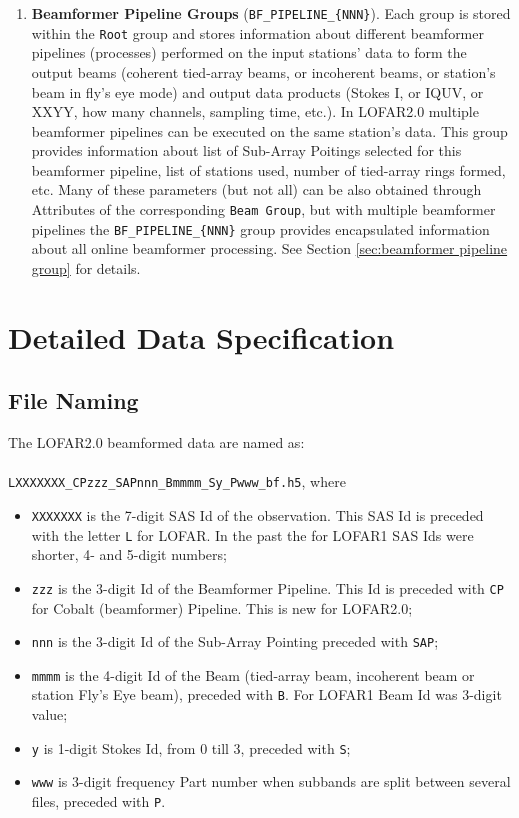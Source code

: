\documentclass[a4paper,10pt,bibtotoc]{scrartcl}
\begin{document}
\begin{enumerate}
\item \textbf{Beamformer Pipeline Groups} (\verb|BF_PIPELINE_{NNN}|). Each group is stored within the \texttt{Root} group and stores information about different beamformer pipelines (processes) performed on the input stations' data to form the output beams (coherent tied-array beams, or incoherent beams, or station's beam in fly's eye mode) and output data products (Stokes I, or IQUV, or XXYY, how many channels, sampling time, etc.). In LOFAR2.0 multiple beamformer pipelines can be executed on the same station's data. This group provides information about list of Sub-Array Poitings selected for this beamformer pipeline, list of stations used, number of tied-array rings formed, etc. Many of these parameters (but not all) can be also obtained through Attributes of the corresponding \texttt{Beam Group}, but with multiple beamformer pipelines the \verb|BF_PIPELINE_{NNN}| group provides encapsulated information about all online beamformer processing. See Section \ref{sec:beamformer pipeline group} for details.


\end{enumerate}


\section{Detailed Data Specification}
\label{sec:detailed data structure}



\subsection{File Naming}
\label{sec:file naming}
The LOFAR2.0 beamformed data are named as:\\\,\\
\verb|LXXXXXXX_CPzzz_SAPnnn_Bmmmm_Sy_Pwww_bf.h5|, where
\begin{itemize}
  \item \texttt{XXXXXXX} is the 7-digit SAS Id of the observation. This SAS Id is preceded with the letter \verb|L| for LOFAR. In the past the for LOFAR1 SAS Ids were shorter, 4- and 5-digit numbers;
  \item \texttt{zzz} is the 3-digit Id of the Beamformer Pipeline. This Id is preceded with \verb|CP| for Cobalt (beamformer) Pipeline. This is new for LOFAR2.0;
  \item \texttt{nnn} is the 3-digit Id of the Sub-Array Pointing preceded with \verb|SAP|;
  \item \texttt{mmmm} is the 4-digit Id of the Beam (tied-array beam, incoherent beam or station Fly's Eye beam), preceded with \verb|B|. For LOFAR1 Beam Id was 3-digit value;
  \item \texttt{y} is 1-digit Stokes Id, from 0 till 3, preceded with \verb|S|;
  \item \texttt{www} is 3-digit frequency Part number when subbands are split between several files, preceded with \verb|P|.
\end{itemize}
\end{document}
